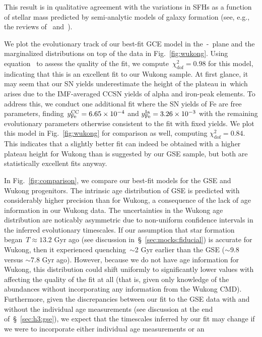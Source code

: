 \documentclass[ms.tex]{subfiles}
\begin{document}
This result is in qualitative agreement with the variations in SFHs as a
function of stellar mass predicted by semi-analytic models of galaxy formation
(see, e.g., the reviews of~\citealt{Baugh2006} and~\citealt{Somerville2015a}).
\par
We plot the evolutionary track of our best-fit GCE model in the~\afe-\feh~plane
and the marginalized distributions on top of the data in Fig.~\ref{fig:wukong}.
Using equation~ to assess the quality of the fit,
we compute~$\chi_\text{dof}^2 = 0.98$ for this model, indicating that this is
an excellent fit to our Wukong sample.
At first glance, it may seem that our SN yields underestimate the height of the
plateau in~\afe which arises due to the IMF-averaged CCSN yields of alpha
and iron-peak elements.
To address this, we conduct one additional fit where the SN yields of Fe are
free parameters, finding~$y_\text{Fe}^\text{CC} = 6.65\times10^{-4}$ and
$y_\text{Fe}^\text{Ia} = 3.26\times10^{-3}$ with the remaining evolutionary parameters
otherwise consistent to the fit with fixed yields.
We plot this model in Fig.~\ref{fig:wukong} for comparison as well, computing
$\chi_\text{dof}^2 = 0.84$.
This indicates that a slightly better fit can indeed be obtained with a higher
plateau height for Wukong than is suggested by our GSE sample, but both are
statistically excellent fits anyway.
\par
In Fig.~\ref{fig:comparison}, we compare our best-fit models for the GSE and
Wukong progenitors.
The intrinsic age distribution of GSE is predicted with considerably higher
precision than for Wukong, a consequence of the lack of age information in our
Wukong data.
The uncertainties in the Wukong age distribution are noticably asymmetric due
to non-uniform confidence intervals in the inferred evolutionary timescales.
If our assumption that star formation began~$T \approx 13.2$ Gyr ago (see
discussion in~\S~\ref{sec:mocks:fiducial}) is accurate for Wukong, then it
experienced quenching~$\sim$2 Gyr earlier than the GSE ($\sim$9.8 versus
$\sim$7.8 Gyr ago).
However, because we do not have age information for Wukong, this distribution
could shift uniformly to significantly lower values with affecting the quality
of the fit at all (that is, given only knowledge of the abundances without
incorporating any information from the Wukong CMD).
Furthermore, given the discrepancies between our fit to the GSE data with and
without the individual age measurements (see discussion at the end
of~\S~\ref{sec:h3:gse}), we expect that the timescales inferred by our fit
may change if we were to incorporate either individual age measurements or an
\end{document}

